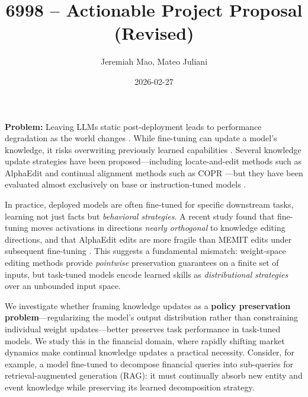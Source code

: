 \documentclass{article}
\title{6998 -- Actionable Project Proposal (Revised)}
\author{Jeremiah Mao, Mateo Juliani}
\date{2026-02-27}
\begin{document}
\maketitle

\textbf{Problem:}
Leaving LLMs static post-deployment leads to performance degradation as the world changes \citep{lazaridou2021mind}. While fine-tuning can update a model's knowledge, it risks overwriting previously learned capabilities \citep{lin2024mitigating}. Several knowledge update strategies have been proposed---including locate-and-edit methods such as AlphaEdit \citep{fang2025alphaedit} and continual alignment methods such as COPR \citep{zhang2024copr}---but they have been evaluated almost exclusively on base or instruction-tuned models \citep{li2024shouldwe}.

In practice, deployed models are often fine-tuned for specific downstream tasks, learning not just facts but \emph{behavioral strategies}. A recent study found that fine-tuning moves activations in directions \emph{nearly orthogonal} to knowledge editing directions, and that AlphaEdit edits are more fragile than MEMIT edits under subsequent fine-tuning \citep{wang2025finetune}. This suggests a fundamental mismatch: weight-space editing methods provide \emph{pointwise} preservation guarantees on a finite set of inputs, but task-tuned models encode learned skills as \emph{distributional strategies} over an unbounded input space.

We investigate whether framing knowledge updates as a \textbf{policy preservation problem}---regularizing the model's output distribution rather than constraining individual weight updates---better preserves task performance in task-tuned models. We study this in the financial domain, where rapidly shifting market dynamics make continual knowledge updates a practical necessity. Consider, for example, a model fine-tuned to decompose financial queries into sub-queries for retrieval-augmented generation (RAG): it must continually absorb new entity and event knowledge while preserving its learned decomposition strategy.

\bigskip
\end{document}

